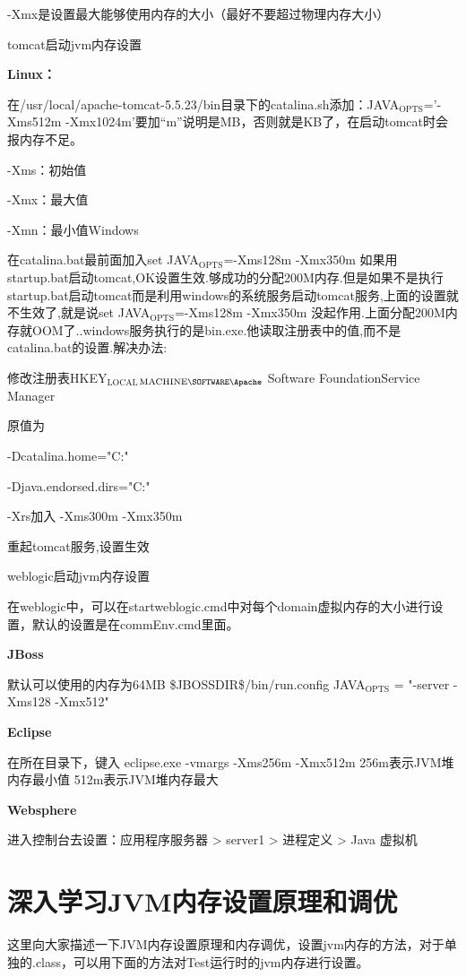 \documentclass[10pt,b5paper]{article}
\begin{document}
-Xmx是设置最大能够使用内存的大小（最好不要超过物理内存大小）

tomcat启动jvm内存设置

\textbf{Linux：}

在/usr/local/apache-tomcat-5.5.23/bin目录下的catalina.sh添加：JAVA$_{\text{OPTS}}$='-Xms512m -Xmx1024m'要加“m”说明是MB，否则就是KB了，在启动tomcat时会报内存不足。

-Xms：初始值

-Xmx：最大值

-Xmn：最小值Windows

在catalina.bat最前面加入set JAVA$_{\text{OPTS}}$=-Xms128m -Xmx350m 如果用startup.bat启动tomcat,OK设置生效.够成功的分配200M内存.但是如果不是执行startup.bat启动tomcat而是利用windows的系统服务启动tomcat服务,上面的设置就不生效了,就是说set JAVA$_{\text{OPTS}}$=-Xms128m -Xmx350m 没起作用.上面分配200M内存就OOM了..windows服务执行的是bin\tomcat.exe.他读取注册表中的值,而不是catalina.bat的设置.解决办法:

修改注册表HKEY$_{\text{LOCAL}}$$_{\text{MACHINE}\SOFTWARE\Apache}$ Software Foundation\Tomcat Service Manager\Parameters\JavaOptions

原值为

-Dcatalina.home="C:\ApacheGroup{}"

-Djava.endorsed.dirs="C:\ApacheGroup{}\common\endorsed"

-Xrs加入 -Xms300m -Xmx350m

重起tomcat服务,设置生效

weblogic启动jvm内存设置

在weblogic中，可以在startweblogic.cmd中对每个domain虚拟内存的大小进行设置，默认的设置是在commEnv.cmd里面。

\textbf{JBoss}

默认可以使用的内存为64MB 
\$JBOSSDIR\$/bin/run.config 
JAVA$_{\text{OPTS}}$ = "-server -Xms128 -Xmx512"

\textbf{Eclipse}

在所在目录下，键入 
eclipse.exe -vmargs -Xms256m -Xmx512m 
256m表示JVM堆内存最小值 
512m表示JVM堆内存最大

\textbf{Websphere}

进入控制台去设置：应用程序服务器 > server1 > 进程定义 > Java 虚拟机
\section{深入学习JVM内存设置原理和调优}
\label{sec-6}
这里向大家描述一下JVM内存设置原理和内存调优，设置jvm内存的方法，对于单独的.class，可以用下面的方法对Test运行时的jvm内存进行设置。
\end{document}
